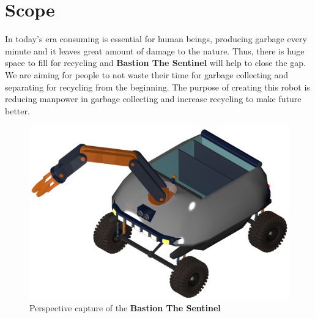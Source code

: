 \documentclass[12pt,a4paper]{article}
\begin{document}
\section{Scope}
 \begin{flushleft}
  In today's era consuming is essential for human beings, producing garbage every minute and it leaves great amount of damage 
  to the nature. Thus, there is huge space to fill for recycling 
  and \textbf{Bastion The Sentinel} will help to close the gap. We are aiming for people to not waste their time for garbage 
  collecting and separating for recycling from the beginning. The purpose of creating this robot is reducing manpower in 
  garbage collecting and increase recycling to make future better.
  \begin{figure}[h]
   \begin{center}
    \includegraphics[scale=0.2]{perspective_box_open}
    \caption{Perspective capture of the \textbf{Bastion The Sentinel}}
   \end{center}
  \end{figure}
 \end{flushleft}
  
\end{document}
